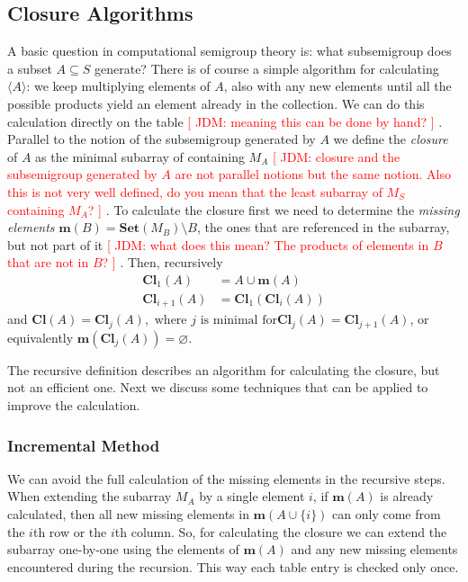 \documentclass{amsart}
\newcommand{\Set}{\mathbf{Set}}
\newcommand{\Miss}{\mathbf{m}}
\newcommand{\Closure}{\mathbf{Cl}}
\newcommand{\todo}[1]{\textcolor{red}{ \small \textsf{[ #1 ]} \normalsize}}
\theoremstyle{plain}
\theoremstyle{definition}
\begin{document}
\subsection{Closure Algorithms}
A basic question in computational semigroup theory is: what subsemigroup does a subset $A\subseteq S$ generate?
There is of course a simple algorithm for calculating $\langle A\rangle$: we keep multiplying elements of $A$, also with any new elements until all the possible products yield an element already in the collection.
We can do this calculation directly on the table\todo{JDM: meaning this can
be done by hand?}. 
Parallel to the notion of the subsemigroup generated by $A$ we define the
\emph{closure} of $A$ as the minimal subarray of containing $M_A$
\todo{JDM: closure and the subsemigroup generated by $A$ are not parallel
  notions but the same notion. Also this is not very well defined, do you mean
that the least subarray of $M_S$ containing $M_A$?}.  To calculate
the closure first we need to determine the \emph{missing elements}
$\Miss(B)=\Set(M_B)\setminus B$, the ones that are referenced in the
subarray,
but not part of it \todo{JDM: what does this mean? The products of elements in
$B$ that are not in $B$?}.  Then, recursively \begin{align*}
\Closure_1(A)&=A\cup\Miss(A)\\ \Closure_{i+1}(A)&=\Closure_1(\Closure_{i}(A))
\end{align*} and $ \Closure(A)=\Closure_j(A), \text{ where $j$ is minimal for
}\Closure_j(A)=\Closure_{j+1}(A)$, or equivalently
$\Miss(\Closure_j(A))=\varnothing$.

The recursive definition describes an algorithm for calculating the closure, but not an efficient one. Next we discuss some techniques that can be applied to improve the calculation.

\subsubsection{Incremental Method}
We can avoid the full calculation of the missing elements in the recursive steps.
When extending the subarray $M_A$ by a single element $i$, if $\Miss(A)$ is already calculated, then all new missing elements in $\Miss(A\cup\{i\})$ can only come from the $i$th row or the $i$th column.
So, for calculating the closure we can extend the subarray one-by-one using the elements of $\Miss(A)$ and any new missing elements encountered during the recursion.
This way each table entry is checked only once.
\end{document}

